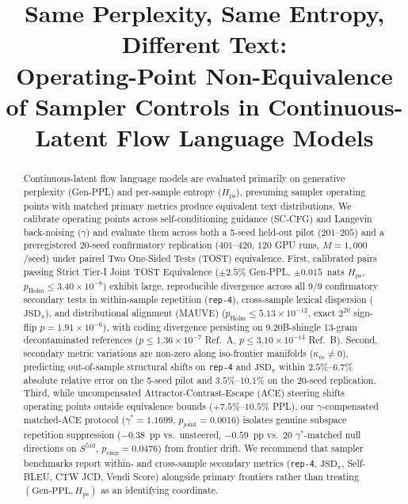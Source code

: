 \documentclass[11pt,a4paper]{article}
\title{Same Perplexity, Same Entropy, Different Text:\\
Operating-Point Non-Equivalence of Sampler Controls in Continuous-Latent Flow Language Models}
\author{}
\begin{document}
\maketitle

\begin{abstract}
Continuous-latent flow language models are evaluated primarily on generative perplexity (Gen-PPL) and per-sample entropy ($H_{\mathrm{ps}}$), presuming sampler operating points with matched primary metrics produce equivalent text distributions.
We calibrate operating points across self-conditioning guidance (SC-CFG) and Langevin back-noising ($\gamma$) and evaluate them across both a 5-seed held-out pilot ($201\text{--}205$) and a preregistered 20-seed confirmatory replication ($401\text{--}420$, $120$ GPU runs, $M=1{,}000$/seed) under paired Two One-Sided Tests (TOST) equivalence.
First, calibrated pairs passing Strict Tier-I Joint TOST Equivalence ($\pm 2.5\%$ Gen-PPL, $\pm 0.015$~nats $H_{\mathrm{ps}}$, $p_{\mathrm{Holm}} \le 3.40\times 10^{-8}$) exhibit large, reproducible divergence across all 9/9 confirmatory secondary tests in within-sample repetition (\texttt{rep-4}), cross-sample lexical dispersion ($\mathrm{JSD}_\pi$), and distributional alignment (MAUVE) ($p_{\mathrm{Holm}} \le 5.13\times 10^{-12}$, exact $2^{20}$ sign-flip $p = 1.91\times 10^{-6}$), with coding divergence persisting on 9.20B-shingle 13-gram decontaminated references ($p \le 1.36\times 10^{-7}$ Ref.~A, $p \le 3.10\times 10^{-14}$ Ref.~B).
Second, secondary metric variations are non-zero along iso-frontier manifolds ($\kappa_m \neq 0$), predicting out-of-sample structural shifts on \texttt{rep-4} and $\mathrm{JSD}_\pi$ within $2.5\%\text{--}6.7\%$ absolute relative error on the 5-seed pilot and $3.5\%\text{--}10.1\%$ on the 20-seed replication.
Third, while uncompensated Attractor-Contrast-Escape (ACE) steering shifts operating points outside equivalence bounds ($+7.5\%\text{--}10.5\%$ PPL), our $\gamma$-compensated matched-ACE protocol ($\gamma^*=1.1699$, $p_{\mathrm{joint}}=0.0016$) isolates genuine subspace repetition suppression ($-0.38$~pp vs.\ unsteered, $-0.59$~pp vs.\ 20 $\gamma^*$-matched null directions on $S^{510}$, $p_{\mathrm{emp}}=0.0476$) from frontier drift.
We recommend that sampler benchmarks report within- and cross-sample secondary metrics (\texttt{rep-4}, $\mathrm{JSD}_\pi$, Self-BLEU, CTW JCD, Vendi Score) alongside primary frontiers rather than treating $(\text{Gen-PPL}, H_{\mathrm{ps}})$ as an identifying coordinate.
\end{abstract}
\end{document}
